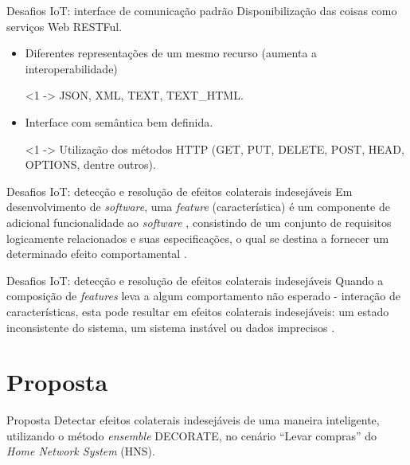\documentclass[brazil]{beamer}
\begin{document}
\begin{frame}{Desafios IoT: interface de comunicação padrão}
\justifying
Disponibilização das coisas como serviços Web RESTFul.
  \begin{itemize}
\justifying
    \item <1 ->Diferentes representações de um mesmo recurso (aumenta a interoperabilidade)
   \begin{examples}<1 ->
       JSON, XML, TEXT, TEXT\_HTML.
   \end{examples}
    \item <2 - >Interface com semântica bem definida.
   \begin{examples}<1 ->
          Utilização dos métodos HTTP (GET, PUT, DELETE, POST, HEAD, OPTIONS, dentre outros).
   \end{examples}
  \end{itemize}
\end{frame}

\begin{frame}{Desafios IoT: detecção e resolução de efeitos colaterais indesejáveis}
\justifying
Em desenvolvimento de \textit{software}, uma \alert{\textit{feature} (característica)} é um componente de adicional funcionalidade ao \textit{software} \cite{Calder:2003}, consistindo de um conjunto de requisitos logicamente relacionados e suas especificações, o qual se destina a fornecer um determinado efeito comportamental \cite{NHLABATSI:2008}.
\end{frame}

\begin{frame}{Desafios IoT: detecção e resolução de efeitos colaterais indesejáveis}
\justifying
Quando a \alert{composição de \textit{features}} leva a algum \alert{comportamento não esperado} - interação de características, esta pode resultar em \alert{efeitos colaterais indesejáveis}: um estado inconsistente do sistema, um sistema instável ou dados imprecisos \cite{NHLABATSI:2008}.
\end{frame}


\section{Proposta}
\begin{frame}{Proposta}
\justifying
Detectar efeitos colaterais indesejáveis de uma maneira inteligente, utilizando o método \textit{ensemble} DECORATE, no cenário ``Levar compras'' do \textit{Home Network System} (HNS).
\end{frame}
\end{document}
